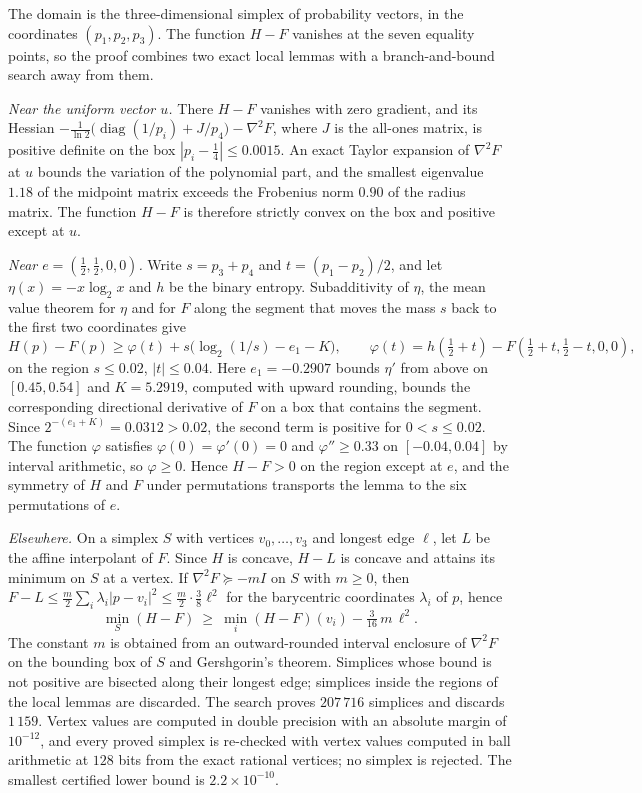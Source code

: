 \documentclass[11pt,a4paper]{article}
\theoremstyle{plain}
\DeclareMathOperator{\diag}{diag}
\begin{document}
The domain is the three-dimensional simplex of probability vectors, in the
coordinates $(p_1,p_2,p_3)$. The function $H-F$ vanishes at the seven equality
points, so the proof combines two exact local lemmas with a branch-and-bound
search away from them.

\emph{Near the uniform vector $u$.} There $H-F$ vanishes with zero gradient,
and its Hessian $-\frac1{\ln2}\bigl(\diag(1/p_i)+J/p_4\bigr)-\nabla^2F$, where
$J$ is the all-ones matrix, is positive definite on the box
$|p_i-\tfrac14|\le0.0015$. An exact Taylor expansion of $\nabla^2F$ at $u$
bounds the variation of the polynomial part, and the smallest eigenvalue
$1.18$ of the midpoint matrix exceeds the Frobenius norm $0.90$ of the radius
matrix. The function $H-F$ is therefore strictly convex on the box and
positive except at $u$.

\emph{Near $e=(\tfrac12,\tfrac12,0,0)$.} Write $s=p_3+p_4$ and
$t=(p_1-p_2)/2$, and let $\eta(x)=-x\log_2x$ and $h$ be the binary entropy.
Subadditivity of $\eta$, the mean value theorem for $\eta$ and for $F$ along the
segment that moves the mass $s$ back to the first two coordinates give
\begin{equation}
  H(p)-F(p)\ge\varphi(t)+s\bigl(\log_2(1/s)-e_1-K\bigr),\qquad
  \varphi(t)=h(\tfrac12+t)-F(\tfrac12+t,\tfrac12-t,0,0),
\end{equation}
on the region $s\le0.02$, $|t|\le0.04$. Here $e_1=-0.2907$ bounds $\eta'$ from
above on $[0.45,0.54]$ and $K=5.2919$, computed with upward rounding, bounds
the corresponding directional derivative of $F$ on a box that contains the
segment. Since $2^{-(e_1+K)}=0.0312>0.02$, the second term is positive for
$0<s\le0.02$. The function $\varphi$ satisfies $\varphi(0)=\varphi'(0)=0$ and
$\varphi''\ge0.33$ on $[-0.04,0.04]$ by interval arithmetic, so $\varphi\ge0$.
Hence $H-F>0$ on the region except at $e$, and the symmetry of $H$ and $F$
under permutations transports the lemma to the six permutations of $e$.

\emph{Elsewhere.} On a simplex $S$ with vertices $v_0,\dots,v_3$ and longest
edge $\ell$, let $L$ be the affine interpolant of $F$. Since $H$ is concave,
$H-L$ is concave and attains its minimum on $S$ at a vertex. If
$\nabla^2F\succeq-mI$ on $S$ with $m\ge0$, then
$F-L\le\frac m2\sum_i\lambda_i|p-v_i|^2\le\frac m2\cdot\frac38\ell^2$ for the
barycentric coordinates $\lambda_i$ of $p$, hence
\begin{equation}
  \min_S(H-F)\ \ge\ \min_i(H-F)(v_i)-\tfrac{3}{16}\,m\,\ell^2 .
\end{equation}
The constant $m$ is obtained from an outward-rounded interval enclosure of
$\nabla^2F$ on the bounding box of $S$ and Gershgorin's theorem. Simplices
whose bound is not positive are bisected along their longest edge; simplices
inside the regions of the local lemmas are discarded. The search proves
$207\,716$ simplices and discards $1\,159$. Vertex values are computed in double
precision with an absolute margin of $10^{-12}$, and every proved simplex is
re-checked with vertex values computed in ball arithmetic at $128$ bits from
the exact rational vertices; no simplex is rejected. The smallest certified
lower bound is $2.2\times10^{-10}$.
\end{document}
